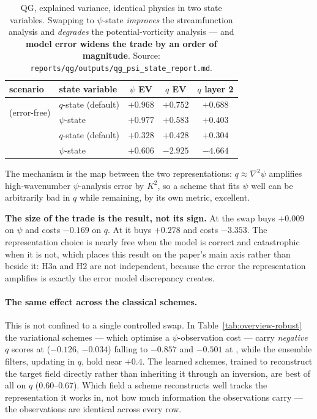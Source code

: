 \begin{table}[t]
\centering
\small
\begin{tabular}{@{}llccc@{}}
\toprule
\textbf{scenario} & \textbf{state variable} & \textbf{$\psi$ EV} & \textbf{$q$ EV} & \textbf{$q$ layer 2} \\
\midrule
\multirow{2}{*}{\Sz{} (error-free)} & $q$-state (default) & $+0.968$ & $\mathbf{+0.752}$ & $+0.688$ \\
                                    & $\psi$-state        & $\mathbf{+0.977}$ & $+0.583$ & $+0.403$ \\
\addlinespace
\multirow{2}{*}{\So{} (model error)} & $q$-state (default) & $+0.328$ & $\mathbf{+0.428}$ & $+0.304$ \\
                                     & $\psi$-state        & $\mathbf{+0.606}$ & $\mathbf{-2.925}$ & $\mathbf{-4.664}$ \\
\bottomrule
\end{tabular}
\caption{QG, explained variance, identical physics in two state variables.
Swapping to $\psi$-state \emph{improves} the streamfunction analysis and
\emph{degrades} the potential-vorticity analysis --- and \textbf{model error
widens the trade by an order of magnitude}. Source:
\texttt{reports/qg/outputs/qg\_psi\_state\_report.md}.}
\label{tab:representation}
\end{table}

The mechanism is the map between the two representations: $q \approx \nabla^2\psi$
amplifies high-wavenumber $\psi$-analysis error by $K^2$, so a scheme that fits
$\psi$ well can be arbitrarily bad in $q$ while remaining, by its own metric,
excellent.

\textbf{The size of the trade is the result, not its sign.} At \Sz{} the swap
buys $+0.009$ on $\psi$ and costs $-0.169$ on $q$. At \So{} it buys $+0.278$ and
costs $-3.353$. The representation choice is nearly free when the model is
correct and catastrophic when it is not, which places this result on the paper's
main axis rather than beside it: H3a and H2 are not independent, because the
error the representation amplifies is exactly the error model discrepancy
creates.

\paragraph{The same effect across the classical schemes.}
This is not confined to a single controlled swap. In
Table~\ref{tab:overview-robust} the variational schemes --- which optimise a
$\psi$-observation cost --- carry \emph{negative} $q$ scores at \Sz{}
($-0.126$, $-0.034$) falling to $-0.857$ and $-0.501$ at \So{}, while the
ensemble filters, updating in $q$, hold near $+0.4$. The learned schemes, trained
to reconstruct the target field directly rather than inheriting it through an
inversion, are best of all on $q$ ($0.60$--$0.67$). Which field a scheme
reconstructs well tracks the representation it works in, not how much information
the observations carry --- the observations are identical across every row.

